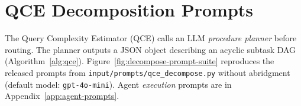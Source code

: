 \section{QCE Decomposition Prompts}
\label{app:decompose-prompts}

The Query Complexity Estimator (QCE) calls an LLM \emph{procedure planner} before routing.
The planner outputs a JSON object describing an acyclic subtask DAG (Algorithm~\ref{alg:qce}).
Figure~\ref{fig:decompose-prompt-suite} reproduces the released prompts from
\texttt{input/prompts/qce\_decompose.py} without abridgment (default model: \texttt{gpt-4o-mini}).
Agent \emph{execution} prompts are in Appendix~\ref{app:agent-prompts}.


\clearpage
